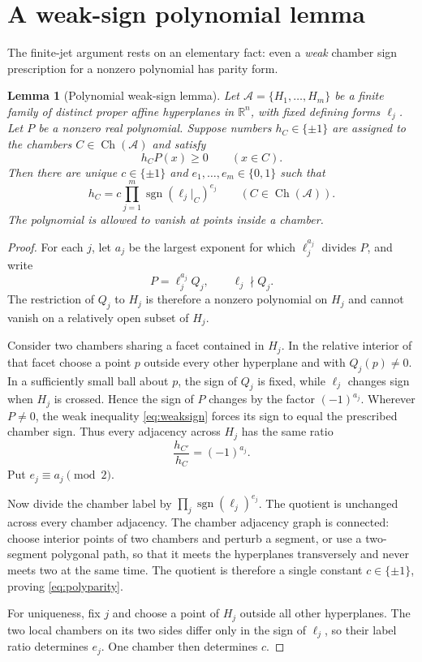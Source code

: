 \documentclass[11pt]{article}
\newtheorem{lemma}[theorem]{Lemma}
\theoremstyle{definition}
\theoremstyle{remark}
\newcommand{\R}{\mathbb{R}}
\newcommand{\bits}{\{0,1\}}
\newcommand{\sign}{\operatorname{sgn}}
\newcommand{\Ch}{\operatorname{Ch}}
\newcommand{\cA}{\mathcal{A}}
\begin{document}
\section{A weak-sign polynomial lemma}\label{sec:polynomial}

The finite-jet argument rests on an elementary fact: even a \emph{weak} chamber sign prescription for a nonzero polynomial has parity form.

\begin{lemma}[Polynomial weak-sign lemma]\label{thm:T1}
Let $\cA=\{H_1,\dots,H_m\}$ be a finite family of distinct proper affine hyperplanes in $\R^n$, with fixed defining forms $\ell_j$. Let $P$ be a nonzero real polynomial. Suppose numbers $h_C\in\{\pm1\}$ are assigned to the chambers $C\in\Ch(\cA)$ and satisfy
\begin{equation}\label{eq:weaksign}
 h_C P(x)\ge0
 \qquad (x\in C).
\end{equation}
Then there are unique $c\in\{\pm1\}$ and $e_1,\dots,e_m\in\bits$ such that
\begin{equation}\label{eq:polyparity}
 h_C=c\prod_{j=1}^m\sign(\ell_j|_C)^{e_j}
 \qquad(C\in\Ch(\cA)).
\end{equation}
The polynomial is allowed to vanish at points inside a chamber.
\end{lemma}

\begin{proof}
For each $j$, let $a_j$ be the largest exponent for which $\ell_j^{a_j}$ divides $P$, and write
\[
 P=\ell_j^{a_j}Q_j,
 \qquad \ell_j\nmid Q_j.
\]
The restriction of $Q_j$ to $H_j$ is therefore a nonzero polynomial on $H_j$ and cannot vanish on a relatively open subset of $H_j$.

Consider two chambers sharing a facet contained in $H_j$. In the relative interior of that facet choose a point $p$ outside every other hyperplane and with $Q_j(p)\ne0$. In a sufficiently small ball about $p$, the sign of $Q_j$ is fixed, while $\ell_j$ changes sign when $H_j$ is crossed. Hence the sign of $P$ changes by the factor $(-1)^{a_j}$. Wherever $P\ne0$, the weak inequality \eqref{eq:weaksign} forces its sign to equal the prescribed chamber sign. Thus every adjacency across $H_j$ has the same ratio
\[
 \frac{h_{C'}}{h_C}=(-1)^{a_j}.
\]
Put $e_j\equiv a_j\pmod2$.

Now divide the chamber label by $\prod_j\sign(\ell_j)^{e_j}$. The quotient is unchanged across every chamber adjacency. The chamber adjacency graph is connected: choose interior points of two chambers and perturb a segment, or use a two-segment polygonal path, so that it meets the hyperplanes transversely and never meets two at the same time. The quotient is therefore a single constant $c\in\{\pm1\}$, proving \eqref{eq:polyparity}.

For uniqueness, fix $j$ and choose a point of $H_j$ outside all other hyperplanes. The two local chambers on its two sides differ only in the sign of $\ell_j$, so their label ratio determines $e_j$. One chamber then determines $c$.
\end{proof}
\end{document}
